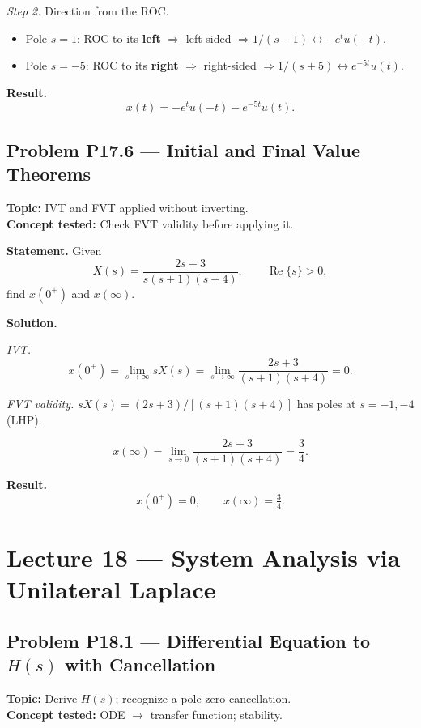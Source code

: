 \documentclass[11pt]{article}
\newcommand{\Real}{\operatorname{Re}}
\begin{document}
\textit{Step 2.} Direction from the ROC.
\begin{itemize}
\item Pole $s=1$: ROC to its \textbf{left} $\Rightarrow$ left-sided $\Rightarrow 1/(s-1)\leftrightarrow -e^{t}u(-t)$.
\item Pole $s=-5$: ROC to its \textbf{right} $\Rightarrow$ right-sided $\Rightarrow 1/(s+5)\leftrightarrow e^{-5t}u(t)$.
\end{itemize}

\textbf{Result.}
\[
\boxed{\,x(t) = -e^{t}u(-t) - e^{-5t}u(t).\,}
\]

\subsection{Problem P17.6 --- Initial and Final Value Theorems}
\textbf{Topic:} IVT and FVT applied without inverting.\\
\textbf{Concept tested:} Check FVT validity before applying it.

\textbf{Statement.} Given
\[
X(s) = \frac{2s+3}{s(s+1)(s+4)},\qquad \Real\{s\}>0,
\]
find $x(0^{+})$ and $x(\infty)$.

\textbf{Solution.}

\textit{IVT.}
\[
x(0^{+}) = \lim_{s\to\infty}sX(s) = \lim_{s\to\infty}\frac{2s+3}{(s+1)(s+4)} = 0.
\]

\textit{FVT validity.} $sX(s) = (2s+3)/[(s+1)(s+4)]$ has poles at
$s=-1,-4$ (LHP). \checkmark

\[
x(\infty) = \lim_{s\to 0}\frac{2s+3}{(s+1)(s+4)} = \frac{3}{4}.
\]

\textbf{Result.}
\[
\boxed{\,x(0^{+})=0,\qquad x(\infty) = \tfrac{3}{4}.\,}
\]

\section{Lecture 18 --- System Analysis via Unilateral Laplace}

\subsection{Problem P18.1 --- Differential Equation to $H(s)$ with Cancellation}
\textbf{Topic:} Derive $H(s)$; recognize a pole-zero cancellation.\\
\textbf{Concept tested:} ODE $\to$ transfer function; stability.
\end{document}
